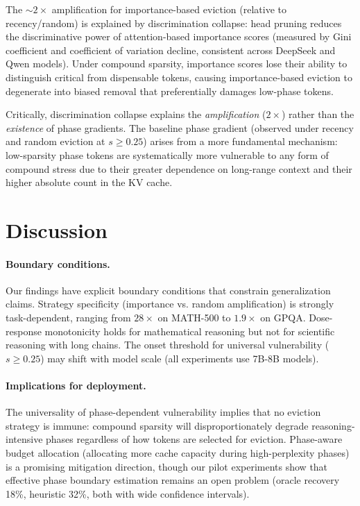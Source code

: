 \documentclass[11pt]{article}
\begin{document}
The $\sim$$2\times$ amplification for importance-based eviction (relative to recency/random) is explained by discrimination collapse: head pruning reduces the discriminative power of attention-based importance scores (measured by Gini coefficient and coefficient of variation decline, consistent across DeepSeek and Qwen models). Under compound sparsity, importance scores lose their ability to distinguish critical from dispensable tokens, causing importance-based eviction to degenerate into biased removal that preferentially damages low-phase tokens.

Critically, discrimination collapse explains the \emph{amplification} ($2\times$) rather than the \emph{existence} of phase gradients. The baseline phase gradient (observed under recency and random eviction at $s \geq 0.25$) arises from a more fundamental mechanism: low-sparsity phase tokens are systematically more vulnerable to any form of compound stress due to their greater dependence on long-range context and their higher absolute count in the KV cache.

\section{Discussion}

\paragraph{Boundary conditions.}
Our findings have explicit boundary conditions that constrain generalization claims. Strategy specificity (importance vs. random amplification) is strongly task-dependent, ranging from $28\times$ on MATH-500 to $1.9\times$ on GPQA. Dose-response monotonicity holds for mathematical reasoning but not for scientific reasoning with long chains. The onset threshold for universal vulnerability ($s \geq 0.25$) may shift with model scale (all experiments use 7B-8B models).

\paragraph{Implications for deployment.}
The universality of phase-dependent vulnerability implies that no eviction strategy is immune: compound sparsity will disproportionately degrade reasoning-intensive phases regardless of how tokens are selected for eviction. Phase-aware budget allocation (allocating more cache capacity during high-perplexity phases) is a promising mitigation direction, though our pilot experiments show that effective phase boundary estimation remains an open problem (oracle recovery 18\%, heuristic 32\%, both with wide confidence intervals).
\end{document}
